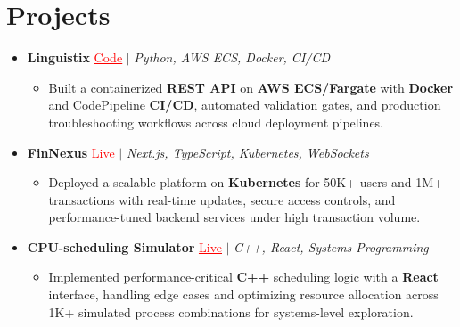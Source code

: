 \documentclass[letterpaper,10pt]{article}
\newcommand{\resumeItem}[1]{\item\small{{#1 \vspace{-2pt}}}}
\newcommand{\resumeProjectHeading}[1]{\item \small #1 \vspace{-2pt}}
\newcommand{\resumeSubHeadingListStart}{\begin{itemize}[leftmargin=0.0in, label={}]}
\newcommand{\resumeSubHeadingListEnd}{\end{itemize}}
\newcommand{\resumeProjItemListStart}{\begin{itemize}[leftmargin=0.15in,label=\textbullet,itemsep=0pt,topsep=0pt,parsep=0pt,partopsep=0pt]}
\newcommand{\resumeProjItemListEnd}{\end{itemize}\vspace{-4pt}}
\begin{document}
\section{Projects}
\resumeSubHeadingListStart
\vspace{-2pt}
\resumeProjectHeading{\textbf{Linguistix} {\href{https://github.com/SAHAJ-BHADJA/Linguistix}{\textcolor{red}{\underline{Code}}}} $|$ \emph{Python, AWS ECS, Docker, CI/CD}}
\resumeProjItemListStart
\resumeItem{Built a containerized \textbf{REST API} on \textbf{AWS ECS/Fargate} with \textbf{Docker} and CodePipeline \textbf{CI/CD}, automated validation gates, and production troubleshooting workflows across cloud deployment pipelines.}
\resumeProjItemListEnd
\vspace{3pt}
\resumeProjectHeading{\textbf{FinNexus} {\href{https://fin-nexus.vercel.app/}{\textcolor{red}{\underline{Live}}}} $|$ \emph{Next.js, TypeScript, Kubernetes, WebSockets}}
\resumeProjItemListStart
\resumeItem{Deployed a scalable platform on \textbf{Kubernetes} for 50K+ users and 1M+ transactions with real-time updates, secure access controls, and performance-tuned backend services under high transaction volume.}
\resumeProjItemListEnd
\vspace{3pt}
\resumeProjectHeading{\textbf{CPU-scheduling Simulator} {\href{https://cpu-scheduler-amber.vercel.app/}{\textcolor{red}{\underline{Live}}}} $|$ \emph{C++, React, Systems Programming}}
\resumeProjItemListStart
\resumeItem{Implemented performance-critical \textbf{C++} scheduling logic with a \textbf{React} interface, handling edge cases and optimizing resource allocation across 1K+ simulated process combinations for systems-level exploration.}
\resumeProjItemListEnd
\resumeSubHeadingListEnd
\end{document}
